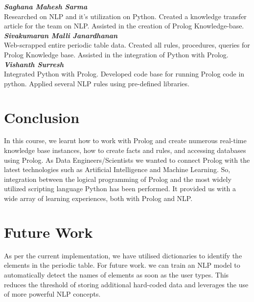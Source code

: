 \documentclass{article}
\begin{document}
\textbf{\textit{Saghana Mahesh Sarma}}\\
Researched on NLP and it's utilization on Python. Created a knowledge transfer article for the team on NLP. Assisted in the creation of Prolog Knowledge-base.\\

\textbf{\textit{Sivakumaran Malli Janardhanan}}\\
Web-scrapped entire periodic table data. Created all rules, procedures, queries for Prolog Knowledge base. Assisted in the integration of Python with Prolog.\\

\textbf{\textit{Vishanth Surresh}}\\
Integrated Python with Prolog. Developed code base for running Prolog code in python. Applied several NLP rules using pre-defined libraries. \\

\section{Conclusion}
In this course, we learnt how to work with Prolog and create numerous real-time knowledge base instances, how to create facts and rules, and accessing databases using Prolog. As Data Engineers/Scientists we wanted to connect Prolog with the latest technologies such as Artificial Intelligence and Machine Learning. So, integration between the logical programming of Prolog and the most widely utilized scripting language Python has been performed. It provided us with a wide array of learning experiences, both with Prolog and NLP.

\section{Future Work}
As per the current implementation, we have utilised dictionaries to identify the elements in the periodic table. For future work. we can train an NLP model to automatically detect the names of elements as soon as the user types. This reduces the threshold of storing additional hard-coded data and leverages the use of more powerful NLP concepts. 

\newpage
\renewcommand{\refname}{References}


\end{document}
